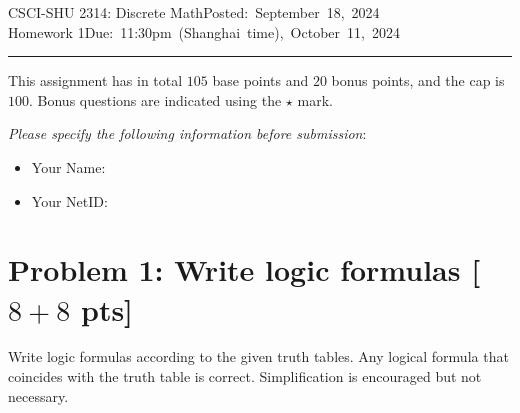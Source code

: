 \documentclass[11pt,twoside]{article}
\newcommand{\homework}[1]{
   \pagestyle{myheadings}
   \thispagestyle{plain}
   \newpage
   \setcounter{page}{1}
   \noindent
   \classname \hfill \mbox{\updatedday} \\
   \instname \hfill \mbox{\duedate}
   \rule{6.5in}{0.5mm}
   \vspace*{-0.1 in}
}
\newcommand{\problem}[1]{\section*{Problem #1}}
\def\classname{CSCI-SHU 2314: Discrete Math}
\def\updatedday{Posted: September 18, 2024}
\def\duedate{Due: 11:30pm (Shanghai time), October 11, 2024}
\def\instname{Homework 1}
\begin{document}
\homework{1}

This assignment has in total $105$ base points and $20$ bonus points, and the cap is $100$.
Bonus questions are indicated using the $\star$ mark.

\textit{Please specify the following information before submission}:
\begin{itemize}
    \item Your Name: %
    \item Your NetID: %
\end{itemize}


\problem{1: Write logic formulas [$8+8$ pts]} 

Write logic formulas according to the given truth tables.
Any logical formula that coincides with the truth table is correct.
Simplification is encouraged but not necessary.
\end{document}
